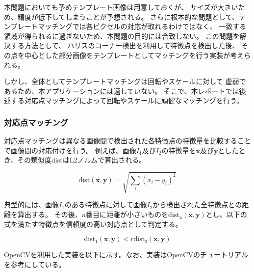 本問題においても予めテンプレート画像は用意しておくが、
サイズが大きいため、精度が低下してしまうことが予想される。
さらに根本的な問題として、テンプレートマッチングでは各ピクセルの対応が取れるわけではなく、
一致する領域が得られるに過ぎないため、本問題の目的には合致しない。
この問題を解決する方法として、
ハリスのコーナー検出\cite{cv}を利用して特徴点を検出した後、
その点を中心とした部分画像をテンプレートとしてマッチングを行う実装が考えられる。

しかし、全体としてテンプレートマッチングは回転やスケールに対して
虚弱であるため、本アプリケーションには適していない。
そこで、本レポートでは後述する対応点マッチングによって回転やスケールに頑健なマッチングを行う。

\subsubsection{対応点マッチング}
対応点マッチングは異なる画像間で検出された各特徴点の特徴量を比較することで画像間の対応付けを行う。
例えば、画像$I_1$及び$I_2$の特徴量を$\bm{x}$及び$\bm{y}$としたとき、その類似度$\mathrm{dist}$はL2ノルムで算出される。

\begin{equation}
    \mathrm{dist}(\bm{x}, \bm{y}) = \sqrt{\sum_{i}(x_i - y_i)^2}
\end{equation}

典型的には、画像$I_1$のある特徴点に対して画像$I_2$から検出された全特徴点との距離を算出する。
その後、$n$番目に距離が小さいものを$\mathrm{dist_n}(\bm{x}, \bm{y})$とし、以下の式を満たす特徴点を信頼度の高い対応点として判定する。\cite{cv}

\begin{equation}
    \mathrm{dist_1}(\bm{x}, \bm{y}) < r \mathrm{dist_2}(\bm{x}, \bm{y})
\end{equation}

OpenCVを利用した実装を以下に示す。なお、実装はOpenCVのチュートリアル\cite{sift_tut}を参考にしている。

